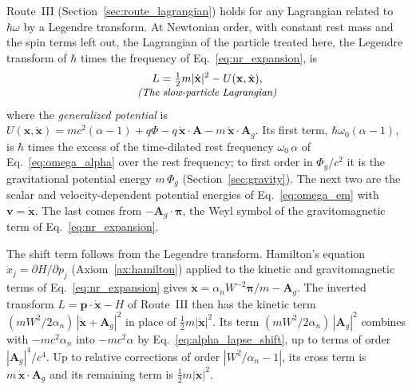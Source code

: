 \documentclass[aps,prd,onecolumn,tightenlines,nofootinbib,notitlepage,11pt,floatfix]{revtex4-2}
\theoremstyle{indentedtheorem}
\begin{document}
Route~III (Section~\ref{sec:route_lagrangian}) holds for any Lagrangian related to $\hbar\omega$ by a Legendre transform. At Newtonian order, with constant rest mass and the spin terms left out, the Lagrangian of the particle treated here, the Legendre transform of $\hbar$ times the frequency of Eq.~\eqref{eq:nr_expansion}, is
\begin{equation}
    \begin{gathered}
    L = \tfrac{1}{2}m|\dot{\mathbf{x}}|^2 - U(\mathbf{x},\dot{\mathbf{x}}) , \\[-3pt]
    \text{\small\itshape (The slow-particle Lagrangian)}
    \end{gathered}
    \label{eq:sgm_lagrangian}
\end{equation}
where the \emph{generalized potential} \citep{Goldstein2002Classical} is $U(\mathbf{x},\dot{\mathbf{x}})=mc^2(\alpha-1)+q\Phi-q\,\dot{\mathbf{x}}\cdot\mathbf{A}-m\,\dot{\mathbf{x}}\cdot\mathbf{A}_g$. Its first term, $\hbar\omega_0(\alpha-1)$, is $\hbar$ times the excess of the time-dilated rest frequency $\omega_0\,\alpha$ of Eq.~\eqref{eq:omega_alpha} over the rest frequency; to first order in $\Phi_g/c^2$ it is the gravitational potential energy $m \, \Phi_g$ (Section~\ref{sec:gravity}). The next two are the scalar and velocity-dependent potential energies of Eq.~\eqref{eq:omega_em} with $\mathbf{v}=\dot{\mathbf{x}}$. The last comes from $-\mathbf{A}_g\cdot\boldsymbol{\pi}$, the Weyl symbol of the gravitomagnetic term of Eq.~\eqref{eq:nr_expansion}.

The shift term follows from the Legendre transform. Hamilton's equation $\dot{x}_j=\partial H/\partial p_j$ (Axiom~\ref{ax:hamilton}) applied to the kinetic and gravitomagnetic terms of Eq.~\eqref{eq:nr_expansion} gives $\dot{\mathbf{x}}=\alpha_nW^{-2}\boldsymbol{\pi}/m-\mathbf{A}_g$. The inverted transform $L=\mathbf{p}\cdot\dot{\mathbf{x}}-H$ of Route~III then has the kinetic term $(mW^2/2\alpha_n)\,|\dot{\mathbf{x}}+\mathbf{A}_g|^2$ in place of $\tfrac{1}{2}m|\dot{\mathbf{x}}|^2$. Its term $(mW^2/2\alpha_n)\,|\mathbf{A}_g|^2$ combines with $-mc^2\alpha_n$ into $-mc^2\alpha$ by Eq.~\eqref{eq:alpha_lapse_shift}, up to terms of order $|\mathbf{A}_g|^4/c^4$. Up to relative corrections of order $|W^2/\alpha_n-1|$, its cross term is $m\,\dot{\mathbf{x}}\cdot\mathbf{A}_g$ and its remaining term is $\tfrac{1}{2}m|\dot{\mathbf{x}}|^2$.
\end{document}
